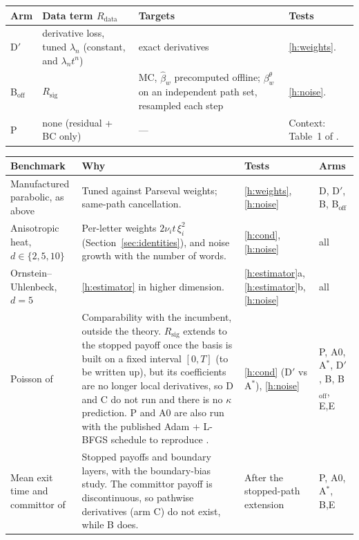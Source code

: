 \documentclass[english]{article}
\begin{document}
\begin{center}
\small
\renewcommand{\arraystretch}{1.15}
\begin{tabularx}{\textwidth}{@{}l >{\raggedright\arraybackslash}p{3.5cm} >{\raggedright\arraybackslash}p{4.6cm} >{\raggedright\arraybackslash}X@{}}
\toprule
Arm & Data term $R_\mathrm{data}$ & Targets & Tests \\
\midrule
D$'$ & derivative loss, tuned $\lambda_n$ (constant, and $\lambda_n t^n$) & exact derivatives & \ref{h:weights}. \\
B$_{\mathrm{off}}$ & $R_\mathrm{sig}$ & MC, $\hat\beta_w$ precomputed offline; $\beta^\theta_w$ on an independent path set, resampled each step & \ref{h:noise}. \\
P & none (residual + BC only) & --- & Context: Table~1 of \cite{tepakbong2026taming}. \\
\bottomrule
\end{tabularx}
\end{center}

\begin{center}
\small
\renewcommand{\arraystretch}{1.15}
\begin{tabularx}{\textwidth}{@{}>{\raggedright\arraybackslash}p{4.2cm} >{\raggedright\arraybackslash}X >{\raggedright\arraybackslash}p{1.6cm} >{\raggedright\arraybackslash}p{2.2cm}@{}}
\toprule
Benchmark & Why & Tests & Arms \\
\midrule
Manufactured parabolic, as above & Tuned against Parseval weights; same-path cancellation. & \ref{h:weights}, \ref{h:noise} & D, D$'$, B, B$_\mathrm{off}$ \\
Anisotropic heat, $d\in\{2,5,10\}$ & Per-letter weights $2\nu_i t\,\xi_i^2$ (Section~\ref{sec:identities}), and noise growth with the number of words. & \ref{h:cond}, \ref{h:noise} & all \\
Ornstein--Uhlenbeck, $d=5$ & \ref{h:estimator} in higher dimension. & \ref{h:estimator}a, \ref{h:estimator}b, \ref{h:noise} & all \\
Poisson of \cite{tepakbong2026taming} & Comparability with the incumbent, outside the theory. $R_\mathrm{sig}$ extends to the stopped payoff once the basis is built on a fixed interval $[0,T]$ (to be written up), but its coefficients are no longer local derivatives, so D and C do not run and there is no $\kappa$ prediction. P and A0 are also run with the published Adam + L-BFGS schedule to reproduce \cite[Table~1]{tepakbong2026taming}. & \ref{h:cond} (D$'$ vs A$^*$), \ref{h:noise} & P, A0, A$^*$, D$'$, B, B$_\mathrm{off}$, E,E\\
Mean exit time and committor of \cite{tepakbong2026taming} & Stopped payoffs and boundary layers, with the boundary-bias study. The committor payoff is discontinuous, so pathwise derivatives (arm C) do not exist, while B does. & After the stopped-path extension & P, A0, A$^*$, B,E\\
\bottomrule
\end{tabularx}
\end{center}
\end{document}
